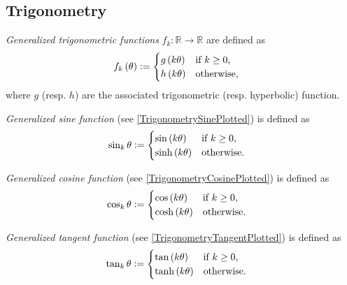 \documentclass[stu, babel, american, biblatex, a4paper, draftall]{apa7}
\begin{document}
\subsection{Trigonometry}
\begin{definition}\label{Trigonometry}
    \textit{Generalized trigonometric functions} $f_k:\mathbb{R}\to\mathbb{R}$ are defined as
    \begin{align*}
        f_k\left(\theta\right) & \vcentcolon=
        \begin{cases}
            g\left(k\theta\right) & \text{if $k\geq0$,} \\
            h\left(k\theta\right) & \text{otherwise,}   \\
        \end{cases}
    \end{align*}
    where $g$ (resp. $h$) are the associated trigonometric (resp. hyperbolic) function.
\end{definition}
\begin{example}\label{TrigonometrySine}
    \textit{Generalized sine function} (see \cref{TrigonometrySinePlotted}) is defined as
    \begin{align*}
        \sin_k{\theta} & \vcentcolon=
        \begin{cases}
            \sin\left(k\theta\right)  & \text{if $k\geq0$,} \\
            \sinh\left(k\theta\right) & \text{otherwise.}   \\
        \end{cases}
    \end{align*}
\end{example}
\begin{example}\label{TrigonometryCosine}
    \textit{Generalized cosine function} (see \cref{TrigonometryCosinePlotted}) is defined as
    \begin{align*}
        \cos_k{\theta} & \vcentcolon=
        \begin{cases}
            \cos\left(k\theta\right)  & \text{if $k\geq0$,} \\
            \cosh\left(k\theta\right) & \text{otherwise.}   \\
        \end{cases}
    \end{align*}
\end{example}
\begin{example}\label{TrigonometryTangent}
    \textit{Generalized tangent function} (see \cref{TrigonometryTangentPlotted}) is defined as
    \begin{align*}
        \tan_k{\theta} & \vcentcolon=
        \begin{cases}
            \tan\left(k\theta\right)  & \text{if $k\geq0$,} \\
            \tanh\left(k\theta\right) & \text{otherwise.}   \\
        \end{cases}
    \end{align*}
\end{example}
\end{document}
